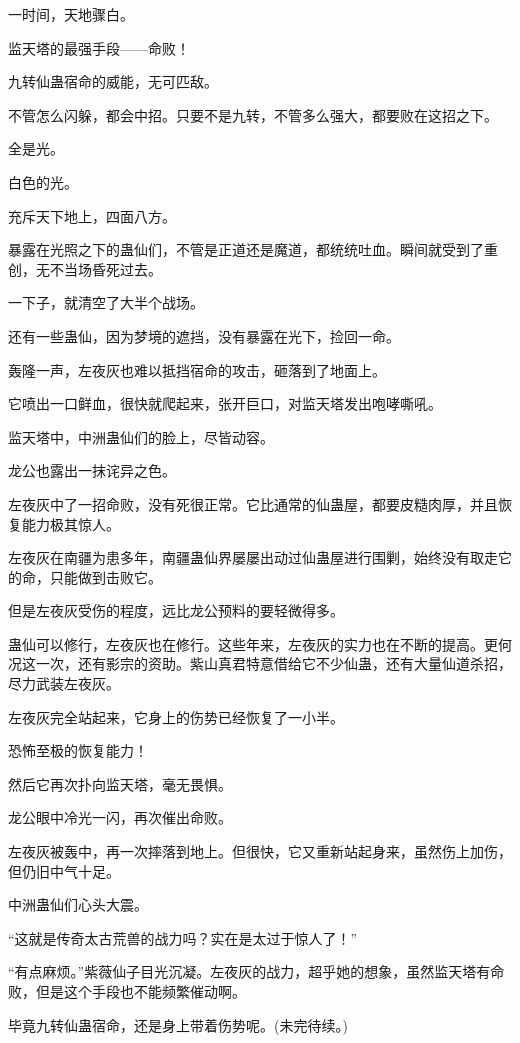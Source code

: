 \begin{this_body}
一时间，天地骤白。

监天塔的最强手段——命败！

九转仙蛊宿命的威能，无可匹敌。

不管怎么闪躲，都会中招。只要不是九转，不管多么强大，都要败在这招之下。

全是光。

白色的光。

充斥天下地上，四面八方。

暴露在光照之下的蛊仙们，不管是正道还是魔道，都统统吐血。瞬间就受到了重创，无不当场昏死过去。

一下子，就清空了大半个战场。

还有一些蛊仙，因为梦境的遮挡，没有暴露在光下，捡回一命。

轰隆一声，左夜灰也难以抵挡宿命的攻击，砸落到了地面上。

它喷出一口鲜血，很快就爬起来，张开巨口，对监天塔发出咆哮嘶吼。

监天塔中，中洲蛊仙们的脸上，尽皆动容。

龙公也露出一抹诧异之色。

左夜灰中了一招命败，没有死很正常。它比通常的仙蛊屋，都要皮糙肉厚，并且恢复能力极其惊人。

左夜灰在南疆为患多年，南疆蛊仙界屡屡出动过仙蛊屋进行围剿，始终没有取走它的命，只能做到击败它。

但是左夜灰受伤的程度，远比龙公预料的要轻微得多。

蛊仙可以修行，左夜灰也在修行。这些年来，左夜灰的实力也在不断的提高。更何况这一次，还有影宗的资助。紫山真君特意借给它不少仙蛊，还有大量仙道杀招，尽力武装左夜灰。

左夜灰完全站起来，它身上的伤势已经恢复了一小半。

恐怖至极的恢复能力！

然后它再次扑向监天塔，毫无畏惧。

龙公眼中冷光一闪，再次催出命败。

左夜灰被轰中，再一次摔落到地上。但很快，它又重新站起身来，虽然伤上加伤，但仍旧中气十足。

中洲蛊仙们心头大震。

“这就是传奇太古荒兽的战力吗？实在是太过于惊人了！”

“有点麻烦。”紫薇仙子目光沉凝。左夜灰的战力，超乎她的想象，虽然监天塔有命败，但是这个手段也不能频繁催动啊。

毕竟九转仙蛊宿命，还是身上带着伤势呢。(未完待续。)

\end{this_body}

